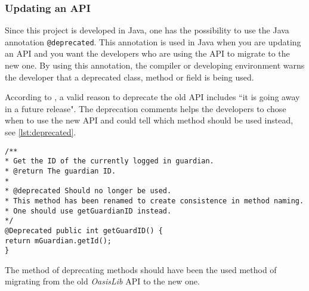 \subsubsection{Updating an API}
Since this project is developed in Java, one has the possibility to use the Java annotation \lstinline{@deprecated}.
This annotation is used in Java when you are updating an API and you want the developers who are using the API to migrate to the new one.
By using this annotation, the compiler or developing environment warns the developer that a deprecated class, method or field is being used.

According to \citet{deprecatedreference}, a valid reason to deprecate the old API includes ``it is going away in a future release". 
The deprecation comments helps the developers to chose when to use the new API and could tell which method should be used instead, see \cref{lst:deprecated}.

\begin{lstlisting}[caption={Example of a deprecated method could look like this.}, label={lst:deprecated}]
/**
* Get the ID of the currently logged in guardian.
* @return The guardian ID.
* 
* @deprecated Should no longer be used.
* This method has been renamed to create consistence in method naming.
* One should use getGuardianID instead.
*/
@Deprecated public int getGuardID() {
return mGuardian.getId();
}
\end{lstlisting}

The method of deprecating methods should have been the used method of migrating from the old \textit{OasisLib} API to the new one.
